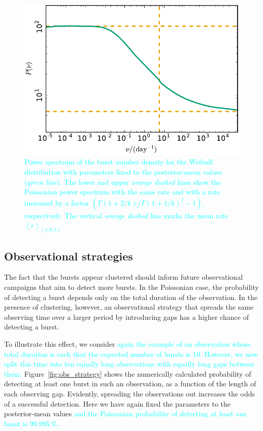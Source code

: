 \documentclass[fleqn,usenatbib]{mnras}
\newcommand{\new}[1]{\textcolor{cyan}{#1}}
\begin{document}
\begin{figure}
	\includegraphics[width=1.0\columnwidth]{powspec_weibull.pdf}
	\caption{\label{fig:powspec}\new{Power spectrum of the burst number density for the Weibull distribution with parameters fixed to the posterior-mean values (\emph{green line}). The lower and upper \emph{orange dashed} lines show the Poissonian power spectrum with the same rate and with a rate increased by a factor $(\Gamma(1 + 2/k)/\Gamma(1 + 1/k)^2 - 1)$, respectively. The vertical \emph{orange dashed} line marks the mean rate $\left<r\right>_{(r|N,t)}$.}}
\end{figure}


\subsection{Observational strategies}
\label{sec:obs_strategies}

The fact that the bursts appear clustered should inform future observational campaigns that aim to detect more bursts. In the Poissonian case, the probability of detecting a burst depends only on the total duration of the observation. In the presence of clustering, however, an observational strategy that spreads the same observing time over a larger period by introducing gaps has a higher chance of detecting a burst.

To illustrate this effect, we consider \new{again the example of an observation whose total duration is such that the expected number of bursts is 10. However, we now split this time into ten equally long observations with equally long gaps between them.} Figure~\ref{fig:obs_strategy} shows the numerically calculated probability of detecting at least one burst in such an observation, as a function of the length of each observing gap. Evidently, spreading the observations out increases the odds of a successful detection. Here we have again fixed the parameters to the posterior-mean values \new{and the Poissonian probability of detecting at least one burst is 99.995\,\%.}
\end{document}
